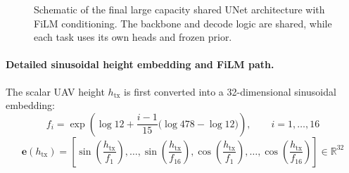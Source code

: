 \begin{figure}[!htbp]
{
}
\caption{Schematic of the final large capacity shared UNet architecture with FiLM conditioning. The backbone and decode logic are shared, while each task uses its own heads and frozen prior.}
\label{fig:try80_arch}
\end{figure}

\paragraph{Detailed sinusoidal height embedding and FiLM path.}
The scalar UAV height $h_{\mathrm{tx}}$ is first
converted into a 32-dimensional sinusoidal embedding:
\begin{equation}
f_i
=
\exp\!\left(
\log 12
+
\frac{i-1}{15}\bigl(\log 478 - \log 12\bigr)
\right),
\qquad i=1,\dots,16
\end{equation}
\begin{equation}
\textbf{e}(h_{\mathrm{tx}})
=
\left[
\sin\!\left(\frac{h_{\mathrm{tx}}}{f_1}\right), \dots,
\sin\!\left(\frac{h_{\mathrm{tx}}}{f_{16}}\right),
\cos\!\left(\frac{h_{\mathrm{tx}}}{f_1}\right), \dots,
\cos\!\left(\frac{h_{\mathrm{tx}}}{f_{16}}\right)
\right]
\in \mathbb{R}^{32}
\label{eq:try80_height_embed}
\end{equation}

